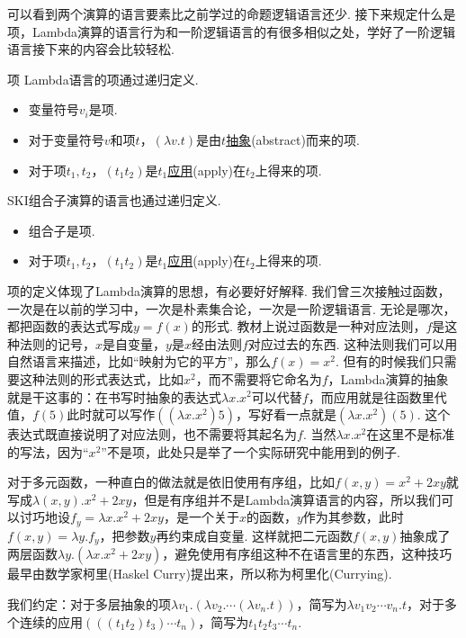 可以看到两个演算的语言要素比之前学过的命题逻辑语言还少. 接下来规定什么是项，Lambda演算的语言行为和一阶逻辑语言的有很多相似之处，学好了一阶逻辑语言接下来的内容会比较轻松.

\begin{definition}{项}
    Lambda语言的项通过递归定义.
    \begin{itemize}
        \item 变量符号\(v_i\)是项.
        \item 对于变量符号\(v\)和项\(t\)，\((\lambda v.t)\)是由\(t\)\underline{抽象}(abstract)而来的项.
        \item 对于项\(t_1,t_2\)，\((t_1t_2)\)是\(t_1\)\underline{应用}(apply)在\(t_2\)上得来的项.
    \end{itemize}
    SKI组合子演算的语言也通过递归定义.
    \begin{itemize}
        \item 组合子是项.
        \item 对于项\(t_1,t_2\)，\((t_1t_2)\)是\(t_1\)\underline{应用}(apply)在\(t_2\)上得来的项.
    \end{itemize}
\end{definition}

项的定义体现了Lambda演算的思想，有必要好好解释. 我们曾三次接触过函数，一次是在以前的学习中，一次是朴素集合论，一次是一阶逻辑语言. 无论是哪次，都把函数的表达式写成\(y=f(x)\)的形式. 教材上说过函数是一种对应法则，\(f\)是这种法则的记号，\(x\)是自变量，\(y\)是\(x\)经由法则\(f\)对应过去的东西. 这种法则我们可以用自然语言来描述，比如“映射为它的平方”，那么\(f(x)=x^2\). 但有的时候我们只需要这种法则的形式表达式，比如\(x^2\)，而不需要将它命名为\(f\)，Lambda演算的抽象就是干这事的：在书写时抽象的表达式\(\lambda x.x^2\)可以代替\(f\)，而应用就是往函数里代值，\(f(5)\)此时就可以写作\(((\lambda x.x^2)5)\)，写好看一点就是\((\lambda x.x^2)(5)\). 这个表达式既直接说明了对应法则，也不需要将其起名为\(f\). 当然\(\lambda x.x^2\)在这里不是标准的写法，因为“\(x^2\)”不是项，此处只是举了一个实际研究中能用到的例子.

对于多元函数，一种直白的做法就是依旧使用有序组，比如\(f(x,y)=x^2+2xy\)就写成\(\lambda(x,y).x^2+2xy\)，但是有序组并不是Lambda演算语言的内容，所以我们可以讨巧地设\(f_y = \lambda x. x^2+2xy\)，是一个关于\(x\)的函数，\(y\)作为其参数，此时\(f(x,y)=\lambda y. f_y\)，把参数\(y\)再约束成自变量. 这样就把二元函数\(f(x,y)\)抽象成了两层函数\(\lambda y. (\lambda x. x^2+2xy)\)，避免使用有序组这种不在语言里的东西，这种技巧最早由数学家柯里(Haskel Curry)提出来，所以称为柯里化(Currying).

\begin{reference}
    我们约定：对于多层抽象的项\(\lambda v_1. (\lambda v_2. \cdots (\lambda v_n. t))\)，简写为\(\lambda v_1v_2\cdots v_n. t\)，对于多个连续的应用\((((t_1t_2)t_3)\cdots t_n)\)，简写为\(t_1t_2t_3\cdots t_n\).
\end{reference}

